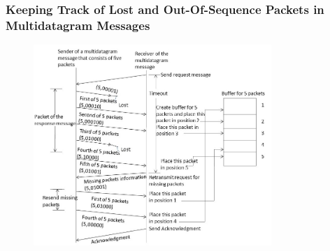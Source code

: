 \documentclass{beamer}
\begin{document}
\begin{frame}
	\frametitle{Keeping Track of Lost and Out-Of-Sequence Packets in 		Multidatagram Messages }
	\begin{figure}
		\centering
		\includegraphics[width=9cm]{fig313.jpg}
	\end{figure}
\end{frame}
\end{document}
